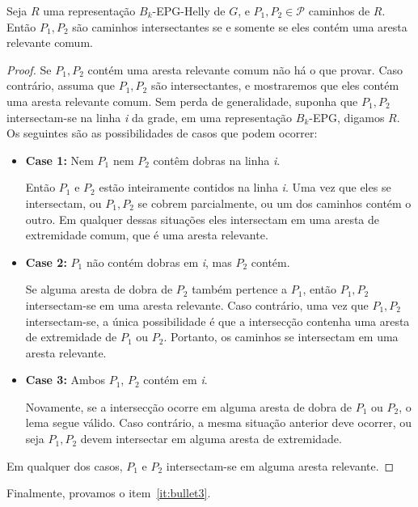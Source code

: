 \begin{lema}\label{lem:relevantEdges}
Seja $R$ uma representação $B_k$-EPG-Helly de $G$, e $P_1, P_2 \in \mathcal{P}$ caminhos de $R$. Então $P_1, P_2$ são caminhos intersectantes se e somente se eles contém uma aresta relevante comum.
\end{lema}


\begin{proof}
Se $P_1, P_2$ contém uma aresta relevante comum não há o que provar. Caso contrário, assuma que $P_1, P_2$ são intersectantes, e mostraremos que eles contém uma aresta relevante comum. Sem perda de generalidade, suponha que $P_1, P_2$ intersectam-se na linha \textit{i} da grade, em uma representação   $B_k$-EPG, digamos $R$. Os seguintes são as possibilidades de casos que podem ocorrer:

\begin{itemize}
\item \textbf{Case 1:} Nem $P_1$ nem $P_2$ contêm dobras na linha \textit{i}. 

Então $P_1$ e $ P_2$  estão inteiramente contidos na linha \textit{i}. Uma vez que eles se intersectam, ou  $P_1, P_2$  se cobrem parcialmente, ou um dos caminhos contém o outro. Em qualquer dessas situações eles intersectam em uma aresta de extremidade comum, que é uma aresta relevante.

\item \textbf{Case 2:} $P_1$ não contém dobras em \textit{i}, mas $ P_2$ contém.

Se alguma aresta de dobra de $P_2$ também pertence a   $P_1$, então $P_1, P_2$  intersectam-se em uma aresta relevante. Caso contrário, uma vez que $P_1, P_2$  intersectam-se, a única possibilidade é que a intersecção contenha uma aresta de extremidade de  $P_1$ ou $ P_2$. Portanto, os caminhos se intersectam em uma aresta relevante.

\item \textbf{Case 3:} Ambos $P_1$,  $P_2$ contém em \textit{i}.

Novamente, se a intersecção ocorre em alguma aresta de dobra de $P_1$  ou $P_2$, o lema segue válido. Caso contrário,  a mesma situação anterior deve ocorrer, ou seja $P_1, P_2$  devem intersectar em alguma aresta de extremidade.
 
\end{itemize}
Em qualquer dos casos, $P_1$ e $P_2$ intersectam-se em alguma aresta relevante.
\end{proof}

Finalmente, provamos o item~\ref{it:bullet3}.

